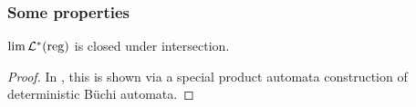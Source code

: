 \subsubsection{Some properties}

\begin{lemma}
\label{reg:limRegClosedIntersection}
$\lim \mathcal{L}^*(\textup{\textrm{reg}})$ is closed under intersection.
\begin{proof}
In \cite[Chapter 12, Remark 12.4]{CAVR112}, this is shown via a special product automata construction of deterministic Büchi automata.
\end{proof}
\end{lemma}
